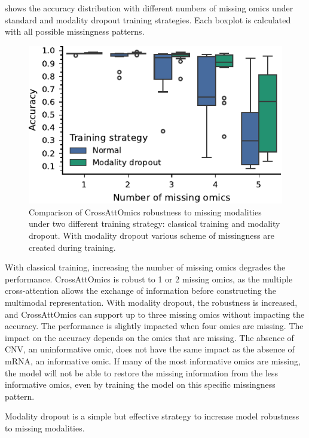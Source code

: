 \documentclass[../main.tex]{subfiles}
\begin{document}
      shows the accuracy distribution with different numbers of missing omics under standard and modality dropout training strategies.
     Each boxplot is calculated with all possible missingness patterns.

     \begin{figure}[htbp]
         \centering
         \includegraphics{robustness_missing_modalities_dropout.pdf}
         \caption{Comparison of CrossAttOmics robustness to missing modalities under two different training strategy: classical training and modality dropout. With modality dropout various scheme of missingness are created during training.}
         \label{fig:modality_dropout}
     \end{figure}

     With classical training, increasing the number of missing omics degrades the performance.
     CrossAttOmics is robust to 1 or 2 missing omics, as the multiple cross-attention allows the exchange of information before constructing the multimodal representation.
     With modality dropout, the robustness is increased, and CrossAttOmics can support up to three missing omics without impacting the accuracy.
     The performance is slightly impacted when four omics are missing.
     The impact on the accuracy depends on the omics that are missing.
     The absence of CNV, an uninformative omic, does not have the same impact as the absence of mRNA, an informative omic.
     If many of the most informative omics are missing, the model will not be able to restore the missing information from the less informative omics, even by training the model on this specific missingness pattern.

     Modality dropout is a simple but effective strategy to increase model robustness to missing modalities.
\end{document}
